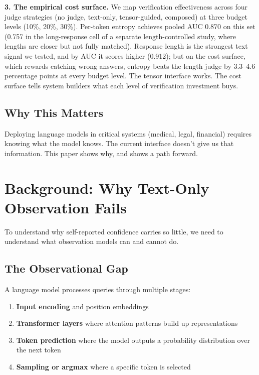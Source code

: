 \documentclass[11pt]{article}
\begin{document}
\textbf{3. The empirical cost surface.} We map verification effectiveness across four judge strategies (no judge, text-only, tensor-guided, composed) at three budget levels (10\%, 20\%, 30\%). Per-token entropy achieves pooled AUC 0.870 on this set (0.757 in the long-response cell of a separate length-controlled study, where lengths are closer but not fully matched). Response length is the strongest text signal we tested, and by AUC it scores higher (0.912); but on the cost surface, which rewards catching wrong answers, entropy beats the length judge by 3.3--4.6 percentage points at every budget level. The tensor interface works. The cost surface tells system builders what each level of verification investment buys.

\subsection{Why This Matters}

Deploying language models in critical systems (medical, legal, financial) requires knowing what the model knows. The current interface doesn't give us that information. This paper shows why, and shows a path forward.

\section{Background: Why Text-Only Observation Fails}\label{sec:background}

To understand why self-reported confidence carries so little, we need to understand what observation models can and cannot do.

\subsection{The Observational Gap}

A language model processes queries through multiple stages:
\begin{enumerate}
    \item \textbf{Input encoding} and position embeddings
    \item \textbf{Transformer layers} where attention patterns build up representations
    \item \textbf{Token prediction} where the model outputs a probability distribution over the next token
    \item \textbf{Sampling or argmax} where a specific token is selected
\end{enumerate}
\end{document}

